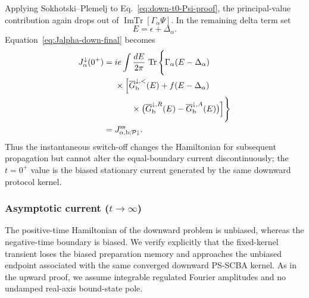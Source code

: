 \documentclass[
 reprint,
 superscriptaddress,
 amsmath,amssymb,
 aps,prb,
 longbibliography,
 floatfix
]{revtex4-2}
\begin{document}
Applying Sokhotski--Plemelj to Eq.~\eqref{eq:down-t0-Psi-proof}, the principal-value contribution again drops out of $\operatorname{ImTr}[\Gamma_\alpha\Psi]$. In the remaining delta term set
\begin{equation*}
E=\epsilon+\Delta_\alpha.
\end{equation*}
Equation~\eqref{eq:Jalpha-down-final} becomes
\begin{equation}
\begin{aligned}
J_\alpha^\downarrow(0^+)
={}&
 ie\int\frac{dE}{2\pi}\,
\operatorname{Tr}\Bigg\{
\Gamma_\alpha(E-\Delta_\alpha)
\\
&\times\Big[
\overline G_{\mathrm b}^{\downarrow,<}(E)
+
f(E-\Delta_\alpha)
\\
&\qquad\times
\big(
\overline G_{\mathrm b}^{\downarrow,R}(E)
-
\overline G_{\mathrm b}^{\downarrow,A}(E)
\big)
\Big]\Bigg\}
\\
={}&
J_{\alpha,\mathrm b;\mathcal P\downarrow}^{\rm ss}.
\end{aligned}
\label{eq:down-t0-current-proof}
\end{equation}
Thus the instantaneous switch-off changes the Hamiltonian for subsequent propagation but cannot alter the equal-boundary current discontinuously; the $t=0^+$ value is the biased stationary current generated by the same downward protocol kernel.

\subsubsection{Asymptotic current ($t\rightarrow\infty$)}

The positive-time Hamiltonian of the downward problem is unbiased, whereas the negative-time boundary is biased. We verify explicitly that the fixed-kernel transient loses the biased preparation memory and approaches the unbiased endpoint associated with the same converged downward PS-SCBA kernel. As in the upward proof, we assume integrable regulated Fourier amplitudes and no undamped real-axis bound-state pole.
\end{document}
